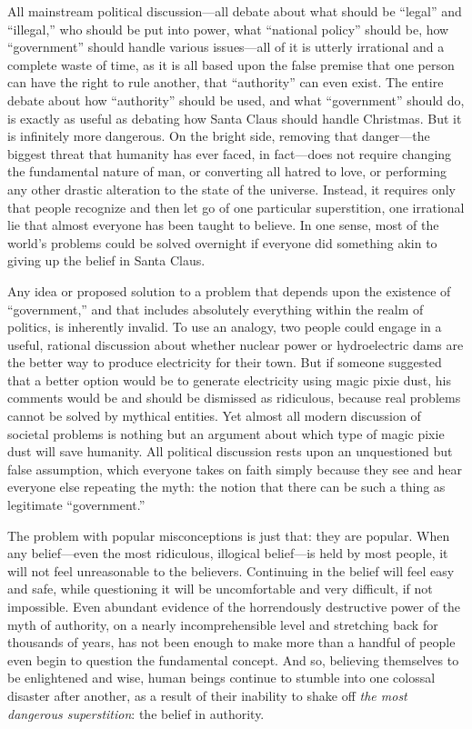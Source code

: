 \documentclass{book}
\begin{document}
All mainstream political discussion---all debate about what should be \enquote{legal} and \enquote{illegal,} who should be put into power, what \enquote{national policy} should be, how \enquote{government} should handle various issues---all of it is utterly irrational and a complete waste of time, as it is all based upon the false premise that one person can have the right to rule another, that \enquote{authority} can even exist. The entire debate about how \enquote{authority} should be used, and what \enquote{government} should do, is exactly as useful as debating how Santa Claus should handle Christmas. But it is infinitely more dangerous. On the bright side, removing that danger---the biggest threat that humanity has ever faced, in fact---does not require changing the fundamental nature of man, or converting all hatred to love, or performing any other drastic alteration to the state of the universe. Instead, it requires only that people recognize and then let go of one particular superstition, one irrational lie that almost everyone has been taught to believe. In one sense, most of the world's problems could be solved overnight if everyone did something akin to giving up the belief in Santa Claus.

Any idea or proposed solution to a problem that depends upon the existence of \enquote{government,} and that includes absolutely everything within the realm of politics, is inherently invalid. To use an analogy, two people could engage in a useful, rational discussion about whether nuclear power or hydroelectric dams are the better way to produce electricity for their town. But if someone suggested that a better option would be to generate electricity using magic pixie dust, his comments would be and should be dismissed as ridiculous, because real problems cannot be solved by mythical entities. Yet almost all modern discussion of societal problems is nothing but an argument about which type of magic pixie dust will save humanity. All political discussion rests upon an unquestioned but false assumption, which everyone takes on faith simply because they see and hear everyone else repeating the myth: the notion that there can be such a thing as legitimate \enquote{government.}

The problem with popular misconceptions is just that: they are popular. When any belief---even the most ridiculous, illogical belief---is held by most people, it will not feel unreasonable to the believers. Continuing in the belief will feel easy and safe, while questioning it will be uncomfortable and very difficult, if not impossible. Even abundant evidence of the horrendously destructive power of the myth of authority, on a nearly incomprehensible level and stretching back for thousands of years, has not been enough to make more than a handful of people even begin to question the fundamental concept. And so, believing themselves to be enlightened and wise, human beings continue to stumble into one colossal disaster after another, as a result of their inability to shake off \emph{the most dangerous superstition}: the belief in authority.
\end{document}
